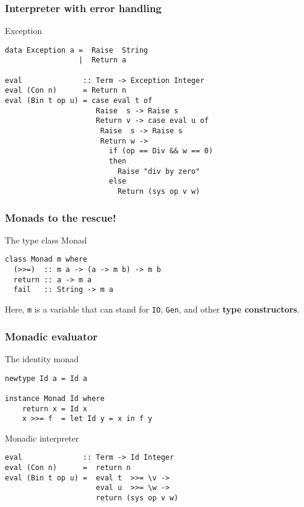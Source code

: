 \documentclass{beamer}
\begin{document}
\begin{frame}[fragile]
  \frametitle{Interpreter with error handling}
  \begin{block}{Exception}
\begin{lstlisting}
data Exception a =  Raise  String
                 |  Return a

eval              :: Term -> Exception Integer
eval (Con n)      = Return n
eval (Bin t op u) = case eval t of
                     Raise  s -> Raise s
                     Return v -> case eval u of
                      Raise  s -> Raise s
                      Return w ->
                        if (op == Div && w == 0)
                        then  
                          Raise "div by zero"
                        else                                  
                          Return (sys op v w)
\end{lstlisting}
\end{block}     
\end{frame}             


\begin{frame}[fragile]
  \frametitle{Monads to the rescue!}
\begin{block}{The type class Monad}
\begin{lstlisting}
class Monad m where
  (>>=)  :: m a -> (a -> m b) -> m b
  return :: a -> m a
  fail   :: String -> m a
\end{lstlisting}
  Here, \texttt{m} is a variable that can stand for \texttt{IO}, \texttt{Gen}, and other \textbf{type constructors}.
\end{block}
\end{frame}     


\begin{frame}[fragile]
  \frametitle{Monadic evaluator}
  \begin{alertblock}{The identity monad}
\begin{lstlisting}
newtype Id a = Id a

instance Monad Id where
    return x = Id x
    x >>= f  = let Id y = x in f y
\end{lstlisting}  
\end{alertblock}

\begin{exampleblock}{Monadic interpreter}
\begin{lstlisting}
eval              :: Term -> Id Integer
eval (Con n)      =  return n
eval (Bin t op u) =  eval t  >>= \v ->
                     eval u  >>= \w ->
                     return (sys op v w)
\end{lstlisting}  
\end{exampleblock}
\end{frame}             
\end{document}
